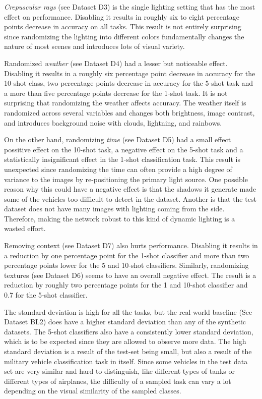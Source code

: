 \textit{Crepuscular rays} (see Dataset D3) is the single lighting setting that has the most effect on performance. Disabling it results in roughly six to eight percentage points decrease in accuracy on all tasks. This result is not entirely surprising since randomizing the lighting into different colors fundamentally changes the nature of most scenes and introduces lots of visual variety.

Randomized \textit{weather} (see Dataset D4) had a lesser but noticeable effect. Disabling it results in a roughly six percentage point decrease in accuracy for the 10-shot class, two percentage points decrease in accuracy for the 5-shot task and a more than five percentage points decrease for the 1-shot task. It is not surprising that randomizing the weather affects accuracy. The weather itself is randomized across several variables and changes both brightness, image contrast, and introduces background noise with clouds, lightning, and rainbows.

On the other hand, randomizing \textit{time} (see Dataset D5) had a small effect possitive effect on the 10-shot task, a negative effect on the 5-shot task and a statistically insignificant effect in the 1-shot classification task. This result is unexpected since randomizing the time can often provide a high degree of variance to the images by re-positioning the primary light source. One possible reason why this could have a negative effect is that the shadows it generate made some of the vehicles too difficult to detect in the dataset. Another is that the test dataset does not have many images with lighting coming from the side. Therefore, making the network robust to this kind of dynamic lighting is a wasted effort.

Removing context (see Dataset D7) also hurts performance. Disabling it results in a reduction by one percentage point for the 1-shot classifier and more than two percentage points lower for the 5 and 10-shot classifiers. Similarly, randomizing textures (see Dataset D6) seems to have an overall negative effect. The result is a reduction by roughly two percentage points for the 1 and 10-shot classifier and 0.7 for the 5-shot classifier.

The standard deviation is high for all the tasks, but the real-world baseline (See Dataset BL2) does have a higher standard deviation than any of the synthetic datasets. The 5-shot classifiers also have a consistently lower standard deviation, which is to be expected since they are allowed to observe more data. The high standard deviation is a result of the test-set being small, but also a result of the military vehicle classification task in itself. Since some vehicles in the test data set are very similar and hard to distinguish, like different types of tanks or different types of airplanes, the difficulty of a sampled task can vary a lot depending on the visual similarity of the sampled classes.

